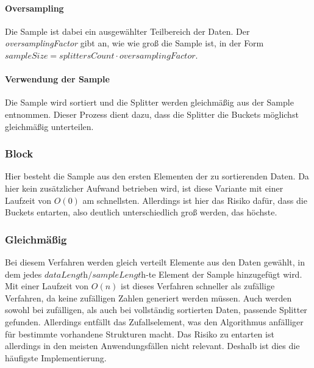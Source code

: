 		\paragraph{Oversampling}
			Die Sample ist dabei ein ausgewählter Teilbereich der Daten. Der \textit{oversamplingFactor} gibt an, wie wie groß die Sample ist, in der Form $\textit{sampleSize}=\textit{splittersCount}\cdot\textit{oversamplingFactor}$.\\
		
		\paragraph{Verwendung der Sample}
			Die Sample wird sortiert und die Splitter werden gleichmäßig aus der Sample entnommen.
			Dieser Prozess dient dazu, dass die Splitter die Buckets möglichst gleichmäßig unterteilen.

		\subsubsection{Block}
			\label{sec:block}
			
			Hier besteht die Sample aus den ersten Elementen der zu sortierenden Daten.
			Da hier kein zusätzlicher Aufwand betrieben wird, ist diese Variante mit einer Laufzeit von $O(0)$ am schnellsten.
			Allerdings ist hier das Risiko dafür, dass die Buckets entarten, also deutlich unterschiedlich groß werden, das höchste.

		\subsubsection{Gleichmäßig}
			\label{sec:even}
			
			Bei diesem Verfahren werden gleich verteilt Elemente aus den Daten gewählt, in dem jedes $\textit{dataLength}/\textit{sampleLength}$-te Element der Sample hinzugefügt wird.\\
			Mit einer Laufzeit von $O(n)$ ist dieses Verfahren schneller als zufällige Verfahren, da keine zufälligen Zahlen generiert werden müssen.
			Auch werden sowohl bei zufälligen, als auch bei vollständig sortierten Daten, passende Splitter gefunden.
			Allerdings entfällt das Zufallselement, was den Algorithmus anfälliger für bestimmte vorhandene Strukturen macht.
			Das Risiko zu entarten ist allerdings in den meisten Anwendungsfällen nicht relevant.
			Deshalb ist dies die häufigste Implementierung.

